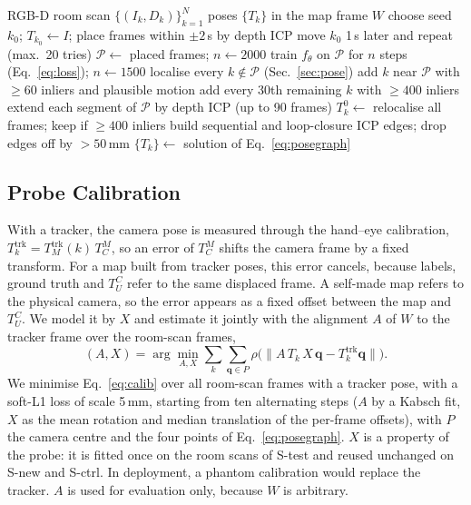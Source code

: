 \documentclass[9pt,shortpaper,twoside,web]{ieeecolor2}
\newcommand{\Stest}{S-test}
\newcommand{\Snew}{S-new}
\newcommand{\Sctrl}{S-ctrl}
\begin{document}
\begin{algorithm}[t]
  \caption{Self-mapping of a room scan}
  \label{alg:mapping}
  \small
  \begin{algorithmic}[1]
    \Require RGB-D room scan $\{(I_k,D_k)\}_{k=1}^{N}$
    \Ensure poses $\{T_k\}$ in the map frame $W$
    \State choose seed $k_0$; $T_{k_0}\gets I$; place frames within $\pm2$\,s by depth ICP
     move $k_0$ 1\,s later and repeat (max.\ 20 tries) \EndIf
    \State $\mathcal{P}\gets$ placed frames; $n\gets2000$
    \Repeat
      \State train $f_\theta$ on $\mathcal{P}$ for $n$ steps (Eq.~\eqref{eq:loss}); $n\gets1500$
      \State localise every $k\notin\mathcal{P}$ (Sec.~\ref{sec:pose})
      \State add $k$ near $\mathcal{P}$ with $\ge60$ inliers and plausible motion
      \State add every 30th remaining $k$ with $\ge400$ inliers
      \State extend each segment of $\mathcal{P}$ by depth ICP (up to 90 frames)
    \State $T^0_k\gets$ relocalise all frames; keep if $\ge400$ inliers
    \State build sequential and loop-closure ICP edges; drop edges off by $>50$\,mm
    \State \Return $\{T_k\}\gets$ solution of Eq.~\eqref{eq:posegraph}
  \end{algorithmic}
\end{algorithm}

\subsection{Probe Calibration}
\label{sec:calib}
With a tracker, the camera pose is measured through the hand--eye calibration, $T^{\mathrm{trk}}_k=T^{\mathrm{trk}}_M(k)\,T^M_C$, so an error of $T^M_C$ shifts the camera frame by a fixed transform. For a map built from tracker poses, this error cancels, because labels, ground truth and $T^C_U$ refer to the same displaced frame. A self-made map refers to the physical camera, so the error appears as a fixed offset between the map and $T^C_U$. We model it by $X$ and estimate it jointly with the alignment $A$ of $W$ to the tracker frame over the room-scan frames,
\begin{equation}
  (A,X)=\arg\min_{A,X}\sum_k\sum_{\mathbf{q}\in P}\rho\big(\|A\,T_k\,X\,\mathbf{q}-T^{\mathrm{trk}}_k\mathbf{q}\|\big).
  \label{eq:calib}
\end{equation}
We minimise Eq.~\eqref{eq:calib} over all room-scan frames with a tracker pose, with a soft-L1 loss of scale 5\,mm, starting from ten alternating steps ($A$ by a Kabsch fit, $X$ as the mean rotation and median translation of the per-frame offsets), with $P$ the camera centre and the four points of Eq.~\eqref{eq:posegraph}. $X$ is a property of the probe: it is fitted once on the room scans of \Stest{} and reused unchanged on \Snew{} and \Sctrl{}. In deployment, a phantom calibration would replace the tracker. $A$ is used for evaluation only, because $W$ is arbitrary.
\end{document}
